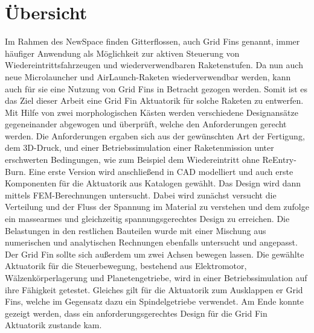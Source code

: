 \chapter*{Übersicht}
Im Rahmen des NewSpace finden Gitterflossen, auch Grid Fins genannt, immer häufiger Anwendung als Möglichkeit zur aktiven Steuerung von Wiedereintrittsfahrzeugen und wiederverwendbaren Raketenstufen. Da nun auch neue Microlauncher und AirLaunch-Raketen wiederverwendbar werden, kann auch für sie eine Nutzung von Grid Fins in Betracht gezogen werden. Somit ist es das Ziel dieser Arbeit eine Grid Fin Aktuatorik für solche Raketen zu entwerfen. Mit Hilfe von zwei morphologischen Kästen werden verschiedene Designansätze gegeneinander abgewogen und überprüft, welche den Anforderungen gerecht werden. Die Anforderungen ergaben sich aus der gewünschten Art der Fertigung, dem 3D-Druck, und einer Betriebssimulation einer Raketenmission unter erschwerten Bedingungen, wie zum Beispiel dem Wiedereintritt ohne ReEntry-Burn.  Eine erste Version wird anschließend in CAD modelliert und auch erste Komponenten für die Aktuatorik aus Katalogen gewählt. Das Design wird dann mittels FEM-Berechnungen untersucht. Dabei wird zunächst versucht die Verteilung und der Fluss der Spannung im Material zu verstehen und dem zufolge ein massearmes und gleichzeitig spannungsgerechtes Design zu erreichen. Die Belastungen in den restlichen Bauteilen wurde mit einer Mischung aus numerischen und analytischen Rechnungen ebenfalls untersucht und angepasst. Der Grid Fin sollte sich außerdem um zwei Achsen bewegen lassen. Die gewählte Aktuatorik für die Steuerbewegung, bestehend aus Elektromotor, Wälzenkörperlagerung und Planetengetriebe, wird in einer Betriebssimulation auf ihre Fähigkeit getestet. Gleiches gilt für die Aktuatorik zum Ausklappen er Grid Fins, welche im Gegensatz dazu ein Spindelgetriebe verwendet. Am Ende konnte gezeigt werden, dass ein anforderungsgerechtes Design für die Grid Fin Aktuatorik zustande kam.